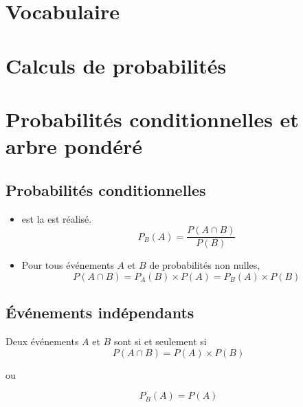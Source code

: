 \documentclass[12pt,a4paper]{article}
\date{}
\title{}
\begin{document}
	
	\section{Vocabulaire}
	

	\section{Calculs de probabilités}
\newpage

\section{Probabilités conditionnelles et arbre pondéré}	



\subsection{Probabilités conditionnelles}

\begin{mybilan}
	\begin{itemize}
		\item {} est la  est réalisé.
		\begin{equation*}
			P_B(A)=\dfrac{P(A \cap B)}{P(B)}
		\end{equation*}
		\item Pour tous événements $A$ et $B$ de probabilités non nulles, 
		\begin{equation*}
			P(A\cap B)= P_A(B) \times P(A) = P_B(A) \times P(B)
		\end{equation*}
	\end{itemize}
\end{mybilan}

\subsection{\'Evénements indépendants}

\begin{mybilan}
	Deux événements $A$ et $B$ sont  si et seulement si
	\begin{equation*}
		P(A \cap B) = P(A) \times P(B)
	\end{equation*}

	\begin{center}
		ou
	\end{center}
	
	\begin{equation*}
		P_B(A) = P(A)
	\end{equation*}
\end{mybilan}
\end{document}
